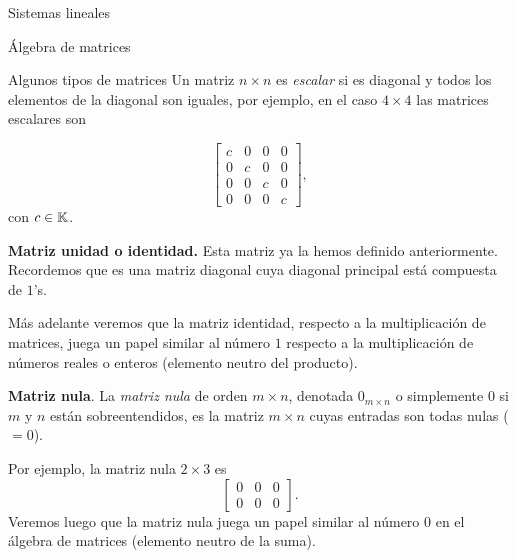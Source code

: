 \begin{chapter}{Sistemas lineales}
\begin{section}{\'Algebra de matrices}
\begin{subsection}{Algunos tipos de matrices}
                Un matriz $n \times n$  es \textit{escalar} si  es diagonal y todos los elementos de la diagonal son iguales, por ejemplo, en el caso $4 \times 4$ las matrices escalares son 
                
                \begin{equation}
                \begin{bmatrix}
                c&0&0&0\\0&c&0&0\\0&0&c&0\\0&0&0&c
                \end{bmatrix},
                \end{equation}
                con $c \in \mathbb K$.
                
                \textbf{Matriz unidad o identidad.} Esta matriz ya la hemos definido anteriormente. Recordemos que es una matriz diagonal cuya diagonal principal está compuesta de $1$'s. 
                
                Más adelante veremos que la matriz identidad, respecto a la multiplicación de matrices, juega un papel similar al número $1$ respecto a la multiplicación de números reales o enteros (elemento neutro del producto).
                
                \textbf{Matriz nula}. La \textit{matriz nula} de orden $m\times n$, denotada $0_{m \times n}$ o simplemente $0$ si $m$ y $n$ están sobreentendidos,  es la  matriz $m \times n$ cuyas entradas son todas nulas ($=0$). 
                
                Por ejemplo, la matriz nula $2 \times 3$ es
                \begin{equation*}
                \begin{bmatrix} 0&0&0\\ 0&0&0\end{bmatrix}.
                \end{equation*}
                Veremos luego que la matriz nula juega un papel similar al número $0$ en el álgebra de matrices (elemento neutro de la suma).  
                

\end{subsection}
\end{section}
\end{chapter}
